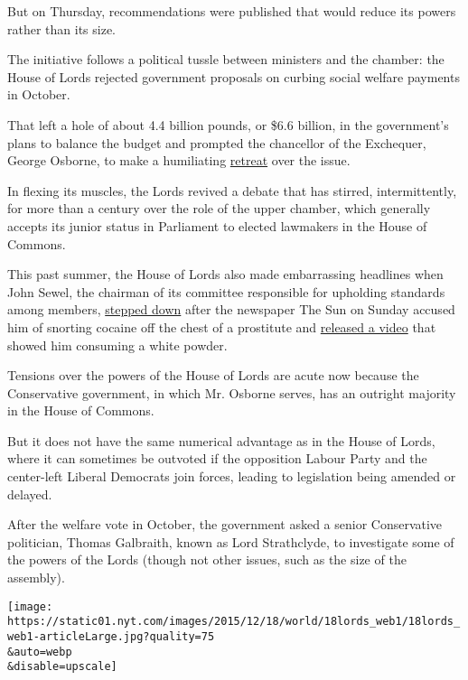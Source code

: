But on Thursday, recommendations were published that would reduce its
powers rather than its size.

The initiative follows a political tussle between ministers and the
chamber: the House of Lords rejected government proposals on curbing
social welfare payments in October.

That left a hole of about 4.4 billion pounds, or \$6.6 billion, in the
government's plans to balance the budget and prompted the chancellor of
the Exchequer, George Osborne, to make a humiliating
\href{http://www.nytimes.com/2015/11/26/world/europe/britain-chancellor-of-the-exchequer-george-osborne-welfare.html}{retreat}
over the issue.

In flexing its muscles, the Lords revived a debate that has stirred,
intermittently, for more than a century over the role of the upper
chamber, which generally accepts its junior status in Parliament to
elected lawmakers in the House of Commons.

This past summer, the House of Lords also made embarrassing headlines
when John Sewel, the chairman of its committee responsible for upholding
standards among members,
\href{http://www.nytimes.com/2015/07/29/world/europe/john-sewel-resigns-from-house-of-lords-in-britain-amid-drugs-prostitutes-scandal.html}{stepped
down} after the newspaper The Sun on Sunday accused him of snorting
cocaine off the chest of a prostitute and
\href{http://www.thesun.co.uk/sol/homepage/news/6560352/Baron-John-Sewel-drug-binges-with-prostitutes.html}{released
a video} that showed him consuming a white powder.

Tensions over the powers of the House of Lords are acute now because the
Conservative government, in which Mr. Osborne serves, has an outright
majority in the House of Commons.

But it does not have the same numerical advantage as in the House of
Lords, where it can sometimes be outvoted if the opposition Labour Party
and the center-left Liberal Democrats join forces, leading to
legislation being amended or delayed.

After the welfare vote in October, the government asked a senior
Conservative politician, Thomas Galbraith, known as Lord Strathclyde, to
investigate some of the powers of the Lords (though not other issues,
such as the size of the assembly).

\texttt{[image: https://static01.nyt.com/images/2015/12/18/world/18lords\_web1/18lords\_web1-articleLarge.jpg?quality=75\\\&auto=webp\\\&disable=upscale]}

